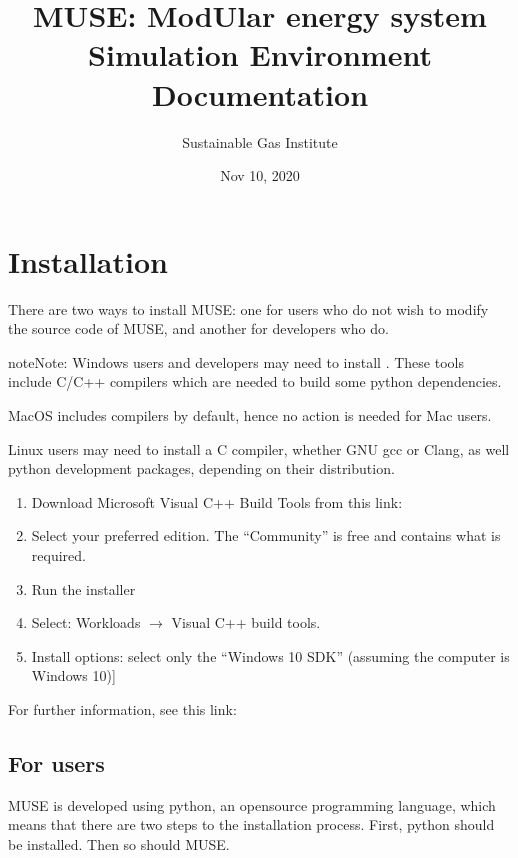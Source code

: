 \documentclass[letterpaper,10pt,english]{sphinxmanual}
\title{MUSE: ModUlar energy system Simulation Environment Documentation}
\date{Nov 10, 2020}
\author{Sustainable Gas Institute}
\begin{document}
\pagestyle{empty}
\sphinxmaketitle
\pagestyle{plain}
\sphinxtableofcontents
\pagestyle{normal}
\label{\detokenize{index::doc}}



\chapter{Installation}
\label{\detokenize{installing-muse:installation}}\label{\detokenize{installing-muse::doc}}
There are two ways to install MUSE: one for users who do not wish to modify the source code of MUSE, and another for developers who do.

\begin{sphinxadmonition}{note}{Note:}
Windows users and developers may need to install . These tools include C/C++ compilers which are needed to build some python dependencies.

MacOS includes compilers by default, hence no action is needed for Mac users.

Linux users may need to install a C compiler, whether GNU gcc or Clang, as well python development packages, depending on their distribution.
\begin{enumerate}
%
\item {} 
Download Microsoft Visual C++ Build Tools from this link: 

\item {} 
Select your preferred edition. The “Community” is free and contains what is required.

\item {} 
Run the installer

\item {} 
Select: Workloads \(\rightarrow\) Visual C++ build tools.

\item {} 
Install options: select only the “Windows 10 SDK” (assuming the computer is Windows 10){]}

\end{enumerate}

For further information, see this link: 
\end{sphinxadmonition}


\section{For users}
\label{\detokenize{installing-muse:for-users}}
MUSE is developed using python, an open\sphinxhyphen{}source programming language, which means that there are two steps to the installation process. First, python should be installed. Then so should MUSE.
\end{document}
